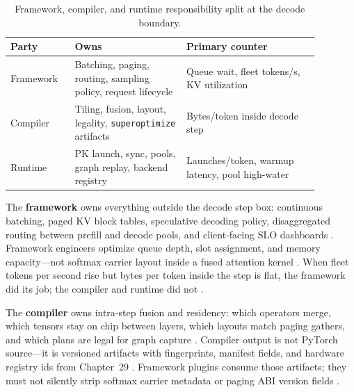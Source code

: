 \begin{table}[t]
\centering
\caption{Framework, compiler, and runtime responsibility split at the decode boundary.}
\label{tab:ch30_responsibility}
\begin{tabular}{@{}p{0.18\linewidth}p{0.32\linewidth}p{0.38\linewidth}@{}}
\toprule
\textbf{Party} & \textbf{Owns} & \textbf{Primary counter} \\
\midrule
Framework & Batching, paging, routing, sampling policy, request lifecycle \citep{kwon2023vllm,patel2025llminference} & Queue wait, fleet tokens/s, KV utilization \\
Compiler & Tiling, fusion, layout, legality, \texttt{superoptimize} artifacts \citep{yirage2026,chen2020compilerbasedhardw} & Bytes/token inside decode step \\
Runtime & PK launch, sync, pools, graph replay, backend registry \citep{yirage2026,nvidia2024cudagraphs} & Launches/token, warmup latency, pool high-water \\
\bottomrule
\end{tabular}
\end{table}

The \textbf{framework} owns everything outside the decode step box: continuous batching, paged KV block tables, speculative decoding policy, disaggregated routing between prefill and decode pools, and client-facing SLO dashboards \citep{kwon2023vllm,patel2025llminference,liu2024deepseekv3,yirage2026,chen2020compilerbasedhardw,taxbreak2026,memoryfloor2026,dlbook}. Framework engineers optimize queue depth, slot assignment, and memory capacity---not softmax carrier layout inside a fused attention kernel \citep{patel2025llminference,kwon2023vllm,dao2022flashattention,yirage2026,chen2020compilerbasedhardw,dlbook}. When fleet tokens per second rise but bytes per token inside the step is flat, the framework did its job; the compiler and runtime did not \citep{memoryfloor2026,taxbreak2026,patel2025llminference,yirage2026,chen2020compilerbasedhardw,dlbook}.

The \textbf{compiler} owns intra-step fusion and residency: which operators merge, which tensors stay on chip between layers, which layouts match paging gathers, and which plans are legal for graph capture \citep{yirage2026,chen2020compilerbasedhardw,dao2022flashattention,semianalysis2024tma,patel2025llminference,kwon2023vllm,taxbreak2026,memoryfloor2026,dlbook}. Compiler output is not PyTorch source---it is versioned artifacts with fingerprints, manifest fields, and hardware registry ids from Chapter~29 \citep{yirage2026,chen2020compilerbasedhardw,patel2025llminference,dlbook}. Framework plugins consume those artifacts; they must not silently strip softmax carrier metadata or paging ABI version fields \citep{kwon2023vllm,yirage2026,chen2020compilerbasedhardw,patel2025llminference,memoryfloor2026,taxbreak2026,dlbook}.

